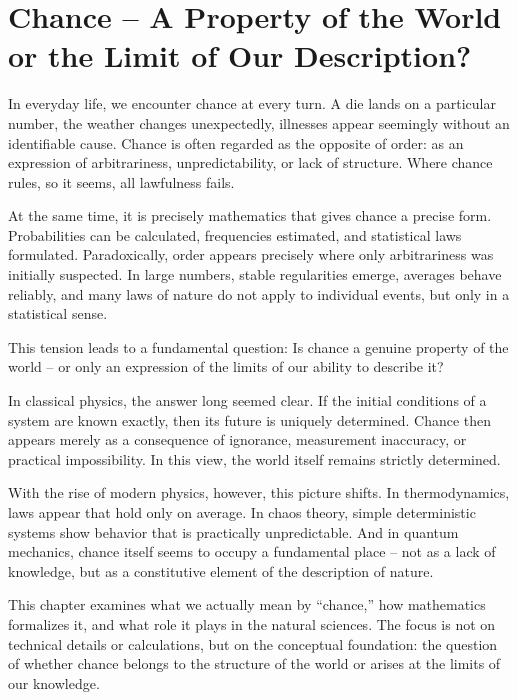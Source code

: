 \chapter[Chance or the Limit of Our Description?]%
{Chance -- A Property of the World or the Limit of Our Description?}


In everyday life, we encounter chance at every turn.
A die lands on a particular number,
the weather changes unexpectedly,
illnesses appear seemingly without an identifiable cause.
Chance is often regarded as the opposite of order:
as an expression of arbitrariness,
unpredictability,
or lack of structure.
Where chance rules,
so it seems,
all lawfulness fails.

At the same time, it is precisely mathematics
that gives chance a precise form.
Probabilities can be calculated,
frequencies estimated,
and statistical laws formulated.
Paradoxically, order appears precisely where
only arbitrariness was initially suspected.
In large numbers, stable regularities emerge,
averages behave reliably,
and many laws of nature do not apply to individual events,
but only in a statistical sense.

This tension leads to a fundamental question:
Is chance a genuine property of the world --
or only an expression of the limits of our ability to describe it?

In classical physics, the answer long seemed clear.
If the initial conditions of a system are known exactly,
then its future is uniquely determined.
Chance then appears merely as a consequence of ignorance,
measurement inaccuracy,
or practical impossibility.
In this view, the world itself remains strictly determined.

With the rise of modern physics, however, this picture shifts.
In thermodynamics, laws appear
that hold only on average.
In chaos theory, simple deterministic systems show behavior
that is practically unpredictable.
And in quantum mechanics, chance itself seems
to occupy a fundamental place --
not as a lack of knowledge,
but as a constitutive element of the description of nature.

This chapter examines
what we actually mean by ``chance,''
how mathematics formalizes it,
and what role it plays in the natural sciences.
The focus is not on technical details or calculations,
but on the conceptual foundation:
the question
of whether chance belongs to the structure of the world
or arises at the limits of our knowledge.

